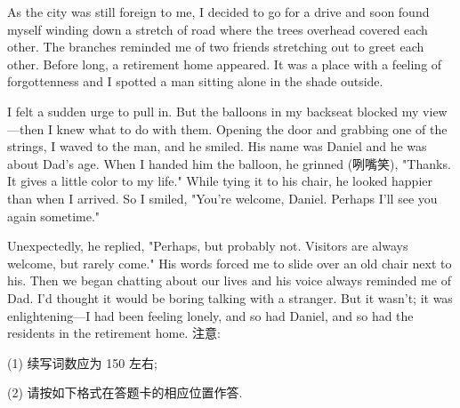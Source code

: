 \documentclass{英语试卷}
\begin{document}
\par As the city was still foreign to me, I decided to go for a drive and soon found myself winding down a stretch of road where the trees overhead covered each other. The branches reminded me of two friends stretching out to greet each other. Before long, a retirement home appeared. It was a place with a feeling of forgottenness and I spotted a man sitting alone in the shade outside.\par
\par I felt a sudden urge to pull in. But the balloons in my backseat blocked my view—then I knew what to do with them. Opening the door and grabbing one of the strings, I waved to the man, and he smiled. His name was Daniel and he was about Dad's age. When I handed him the balloon, he grinned (咧嘴笑), "Thanks. It gives a little color to my life." While tying it to his chair, he looked happier than when I arrived. So I smiled, "You’re welcome, Daniel. Perhaps I’ll see you again sometime."\par
\par Unexpectedly, he replied, "Perhaps, but probably not. Visitors are always welcome, but rarely come." His words forced me to slide over an old chair next to his. Then we began chatting about our lives and his voice always reminded me of Dad. I'd thought it would be boring talking with a stranger. But it wasn't; it was enlightening—I had been feeling lonely, and so had Daniel, and so had the residents in the retirement home. 注意:\par
\par (1) 续写词数应为 150 左右;\par
\par (2) 请按如下格式在答题卡的相应位置作答.\par
{}
\end{document}
